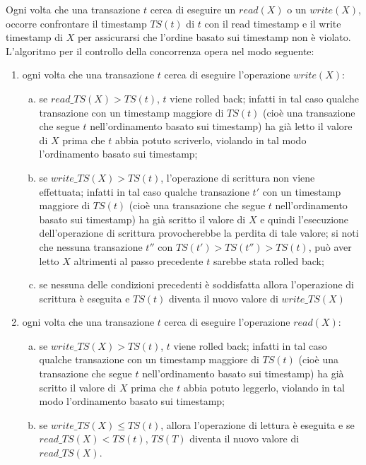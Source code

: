 Ogni volta che una transazione $t$ cerca di eseguire un $read(X)$ o un $write(X)$, occorre confrontare il
timestamp $TS(t)$ di $t$ con il read timestamp e il write timestamp di $X$ per assicurarsi che l'ordine
basato sui timestamp non è violato. L'algoritmo per il controllo della concorrenza opera nel modo
seguente:
\begin{enumerate}
 \item ogni volta che una transazione $t$ cerca di eseguire l'operazione $write(X)$:
 \begin{enumerate}[a)]
  \item se $read\_TS(X) > TS(t)$, $t$ viene rolled back; infatti in tal caso qualche transazione con un
timestamp maggiore di $TS(t)$ (cioè una transazione che segue $t$ nell'ordinamento basato sui
timestamp) ha già letto il valore di $X$ prima che $t$ abbia potuto scriverlo, violando in tal
modo l'ordinamento basato sui timestamp;
 \item se $write\_TS(X) > TS(t)$, l'operazione di scrittura non viene effettuata; infatti in tal caso
qualche transazione $t'$ con un timestamp maggiore di $TS(t)$ (cioè una transazione che segue
$t$ nell'ordinamento basato sui timestamp) ha già scritto il valore di $X$ e quindi l'esecuzione
dell'operazione di scrittura provocherebbe la perdita di tale valore; si noti che nessuna
transazione $t''$ con $TS(t') > TS(t'') > TS(t)$, può aver letto $X$ altrimenti al passo precedente $t$
sarebbe stata rolled back;
\item se nessuna delle condizioni precedenti è soddisfatta allora l'operazione di scrittura è eseguita
e $TS(t)$ diventa il nuovo valore di $write\_TS(X)$
\end{enumerate}

\item ogni volta che una transazione $t$ cerca di eseguire l'operazione $read(X)$:
 \begin{enumerate}[a)]
\item se $write\_TS(X) > TS(t)$, $t$ viene rolled back; infatti in tal caso qualche transazione con un
timestamp maggiore di $TS(t)$ (cioè una transazione che segue $t$ nell'ordinamento basato sui
timestamp) ha già scritto il valore di $X$ prima che $t$ abbia potuto leggerlo, violando in tal
modo l'ordinamento basato sui timestamp;
\item se $write\_TS(X) \leq TS(t)$, allora l'operazione di lettura è eseguita e se $read\_TS(X) < TS(t)$,
$TS(T)$ diventa il nuovo valore di $read\_TS(X)$.
\end{enumerate}
\end{enumerate}

